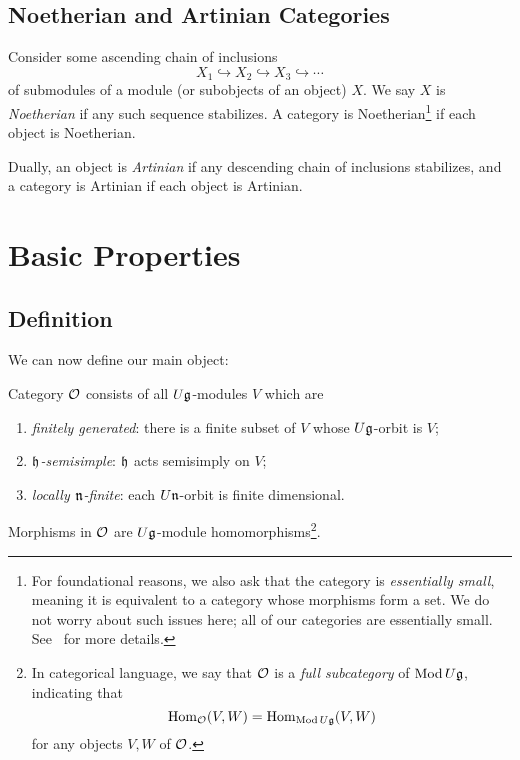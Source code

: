 \documentclass[11pt]{article}
\begin{document}

\subsection{Noetherian and Artinian Categories}

Consider some ascending chain of inclusions \[
	X_1\hookrightarrow X_2\hookrightarrow X_3\hookrightarrow\cdots
\]
of submodules of a module (or subobjects of an object) $X$. We say $X$ is
\emph{Noetherian} if any such sequence stabilizes. A category is
Noetherian\footnote{
	For foundational reasons, we also ask that the category is \emph{essentially
		small}, meaning it is equivalent to a category whose morphisms form a set. We
	do not worry about such issues here; all of our categories are essentially
	small. See~\cite[Section 1.6]{maclane} for more details.
} if each object is
Noetherian.

Dually, an object is \emph{Artinian} if any descending chain of
inclusions stabilizes, and a category is Artinian if each object is Artinian.

\section{Basic Properties}
\label{sec:definition}

\subsection{Definition}

We can now define our main object:
\begin{dfn}[category $\cO$]\label{def:category O}
	Category $\cO$ consists of all $U\mathfrak{g}$-modules $V$ which are
	\begin{enumerate}[label={\Roman*}., ref={\Roman*}]
		\item \emph{finitely generated}: there is a finite subset of $V$ whose
		      $U\mathfrak{g}$-orbit is $V$;\label{ax:finitely generated}
		\item \emph{$\mathfrak{h}$-semisimple}: $\mathfrak{h}$ acts semisimply on
		      $V$;\label{ax:h-semisimple}
		\item \emph{locally $\mathfrak{n}$-finite}: each $U\mathfrak{n}$-orbit is finite
		      dimensional.\label{ax:n-finite}
	\end{enumerate}
	Morphisms in $\cO$ are $U\mathfrak{g}$-module homomorphisms\footnote{
		In categorical language, we say that $\cO$ is a \emph{full subcategory} of
		$\operatorname{Mod} U\mathfrak{g}$, indicating that \[\operatorname{Hom}_{\mathcal{O}}(V, W) = \operatorname{Hom}_{\operatorname{Mod} U\mathfrak{g}}(V, W)\] for
		any objects $V,W$ of $\cO$.
	}.
\end{dfn}
\end{document}
